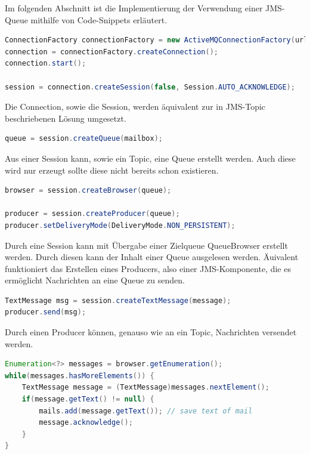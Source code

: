 \documentclass[11pt, a4paper]{article}
\begin{document}
Im folgenden Abschnitt ist die Implementierung der Verwendung einer JMS-Queue mithilfe von Code-Snippets erläutert.

\begin{lstlisting}[language=Java]
ConnectionFactory connectionFactory = new ActiveMQConnectionFactory(url);
connection = connectionFactory.createConnection();
connection.start();
			
session = connection.createSession(false, Session.AUTO_ACKNOWLEDGE);
\end{lstlisting}

Die Connection, sowie die Session, werden äquivalent zur in JMS-Topic beschriebenen Lösung umgesetzt.

\begin{lstlisting}[language=Java]
queue = session.createQueue(mailbox);
\end{lstlisting}

Aus einer Session kann, sowie ein Topic, eine Queue erstellt werden. Auch diese wird nur erzeugt sollte diese nicht bereits schon existieren.

\begin{lstlisting}[language=Java]
browser = session.createBrowser(queue);

producer = session.createProducer(queue);
producer.setDeliveryMode(DeliveryMode.NON_PERSISTENT);
\end{lstlisting}

Durch eine Session kann mit Übergabe einer Zielqueue QueueBrowser erstellt werden. Durch diesen kann der Inhalt einer Queue ausgelesen werden.
Äuivalent funktioniert das Erstellen eines Producers, also einer JMS-Komponente, die es ermöglicht Nachrichten an eine Queue zu senden.

\begin{lstlisting}[language=Java]
TextMessage msg = session.createTextMessage(message);
producer.send(msg);
\end{lstlisting}

Durch einen Producer können, genauso wie an ein Topic, Nachrichten versendet werden.

\begin{lstlisting}[language=Java]
Enumeration<?> messages = browser.getEnumeration();
while(messages.hasMoreElements()) {
	TextMessage message = (TextMessage)messages.nextElement();
	if(message.getText() != null) {
		mails.add(message.getText()); // save text of mail
		message.acknowledge();
	}
}
\end{lstlisting}
\end{document}
